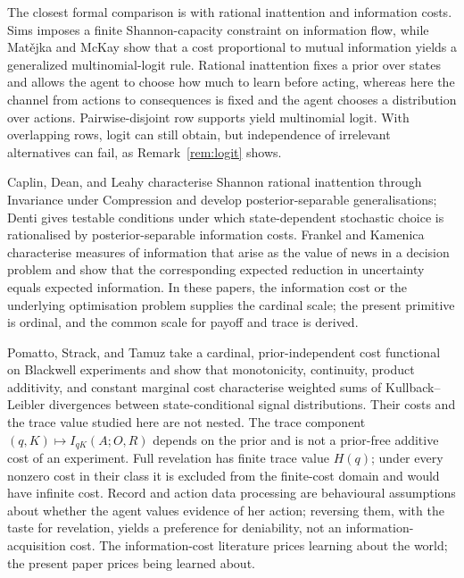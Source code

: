 \documentclass[11pt,a4paper]{article}
\theoremstyle{definition}
\newcommand{\Sh}{H}
\newcommand{\1}{\mathbf 1}
\begin{document}
The closest formal comparison is with rational inattention and information costs.  Sims \cite{Sims2003} imposes
a finite Shannon-capacity constraint on information flow, while Mat\v{e}jka and McKay
\cite{MatejkaMcKay2015} show that a cost proportional to mutual information yields a generalized
multinomial-logit rule.  Rational inattention fixes a prior over states and allows the agent to choose how much
to learn before acting, whereas here the channel from actions to consequences is fixed and the agent chooses a
distribution over actions.  Pairwise-disjoint row supports yield multinomial logit.  With overlapping rows,
logit can still obtain, but independence of irrelevant alternatives can fail, as Remark~\ref{rem:logit} shows.

Caplin, Dean, and Leahy \cite{CaplinDeanLeahy2022} characterise Shannon rational inattention through Invariance
under Compression and develop posterior-separable generalisations; Denti \cite{Denti2022} gives testable
conditions under which state-dependent stochastic choice is rationalised by posterior-separable information
costs.  Frankel and Kamenica \cite{FrankelKamenica2019} characterise measures of information that arise as the
value of news in a decision problem and show that the corresponding expected reduction in uncertainty equals
expected information.  In these papers, the information cost or the underlying optimisation problem supplies
the cardinal scale; the present primitive is ordinal, and the common scale for payoff and trace is derived.

Pomatto, Strack, and Tamuz \cite{PomattoStrackTamuz2023} take a cardinal, prior-independent cost functional on
Blackwell experiments and show that monotonicity, continuity, product additivity, and constant marginal cost
characterise weighted sums of Kullback--Leibler divergences between state-conditional signal distributions.
Their costs and the trace value studied here are not nested.  The trace component
$(q,K)\mapsto I_{qK}(A;O,R)$ depends on the prior and is not a prior-free additive cost of an experiment.  Full
revelation has finite trace value $\Sh(q)$; under every nonzero cost in their class it is excluded from the
finite-cost domain and would have infinite cost.  Record and action data processing are behavioural assumptions
about whether the agent values evidence of her action; reversing them, with the taste for revelation, yields a
preference for deniability, not an information-acquisition cost.  The information-cost literature prices
learning about the world; the present paper prices being learned about.
\end{document}
